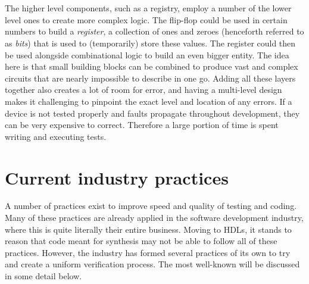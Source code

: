 \documentclass[11pt,british]{article}
\begin{document}
\\
\\
The higher level components, such as a registry, employ a number of the lower level ones to create more complex logic.\cite{vhdlsynth3} The flip-flop could be used in certain numbers to build a \emph{register}, a collection of ones and zeroes (henceforth referred to as \emph{bits}) that is used to (temporarily) store these values. The register could then be used alongside combinational logic to build an even bigger entity. The idea here is that small building blocks can be combined to produce vast and complex circuits that are nearly impossible to describe in one go.\cite{vhdlhierarchy} Adding all these layers together also creates a lot of room for error, and having a multi-level design makes it challenging to pinpoint the exact level and location of any errors. If a device is not tested properly and faults propagate throughout development, they can be very expensive to correct.\cite{weber06} Therefore a large portion of time is spent writing and executing tests. 


\newpage

\section{Current industry practices}
\label{sec:industry}
A number of practices exist to improve speed and quality of testing and coding. Many of these practices are already applied in the software development industry, where this is quite literally their entire business. Moving to \gls{HDL}s, it stands to reason that code meant for synthesis may not be able to follow all of these practices. However, the industry has formed several practices of its own to try and create a uniform verification process. The most well-known will be discussed in some detail below.
\end{document}
